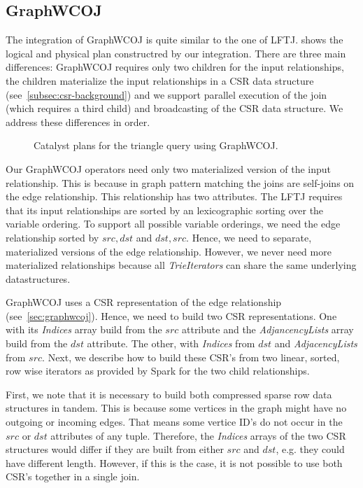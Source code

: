 \subsection{GraphWCOJ} \label{subsec:spark-integration-graphWCOJ}
The integration of GraphWCOJ is quite similar to the one of \textsc{LFTJ}.
 shows the logical and physical plan constructred by our integration.
There are three main differences: GraphWCOJ requires only two children for the input relationships, the children materialize the input
relationships in a CSR data structure (see~\cref{subsec:csr-background}) and we support parallel execution of the join (which requires
a third child) and broadcasting of the CSR data structure.
We address these differences in order.

\begin{figure}
    \caption{Catalyst plans for the triangle query using GraphWCOJ.}
    \label{fig:graphWCOJ-catalyst-plan}
\end{figure}

Our GraphWCOJ operators need only two materialized version of the input relationship.
This is because in graph pattern matching the joins are self-joins on the edge relationship.
This relationship has two attributes.
The \textsc{LFTJ} requires that its input relationships are sorted by an lexicographic sorting over the variable ordering.
To support all possible variable orderings, we need the edge relationship sorted by $src, dst$ and $dst, src$.
Hence, we need to separate, materialized versions of the edge relationship.
However, we never need more materialized relationships because all \textit{TrieIterators} can share the same underlying datastructures.

GraphWCOJ uses a CSR representation of the edge relationship (see~\cref{sec:graphwcoj}).
Hence, we need to build two CSR representations.
One with its \textit{Indices} array build from the $src$ attribute and the \textit{AdjancencyLists} array build from the $dst$ attribute.
The other, with \textit{Indices} from $dst$ and \textit{AdjacencyLists} from $src$.
Next, we describe how to build these CSR's from two linear, sorted, row wise iterators as provided by Spark for the two child relationships.

First, we note that it is necessary to build both compressed sparse row data structures in tandem.
This is because some vertices in the graph might have no outgoing or incoming edges.
That means some vertice ID's do not occur in the $src$ or $dst$ attributes of any tuple.
Therefore, the \textit{Indices} arrays of the two CSR structures would differ if they are built from either $src$ and $dst$, e.g.
they could have different length.
However, if this is the case, it is not possible to use both CSR's together in a single join.

